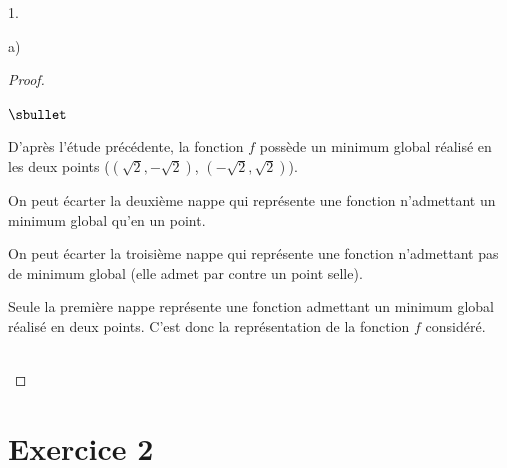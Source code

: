 \documentclass[11pt]{article}%
\begin{document}
\begin{noliste}{1.}
\begin{noliste}{a)}
    
    \begin{proof}~%
      \begin{noliste}{$\sbullet$}
      \item D'après l'étude précédente, la fonction $f$ possède un
        minimum global réalisé en les deux points ($(\sqrt{2},
        -\sqrt{2})$, $(-\sqrt{2}, \sqrt{2})$).
      \item On peut écarter la deuxième nappe qui représente une
        fonction n'admettant un minimum global qu'en un point.
      \item On peut écarter la troisième nappe qui représente une
        fonction n'admettant pas de minimum global (elle admet par
        contre un point selle).
      \item Seule la première nappe représente une fonction admettant
        un minimum global réalisé en deux points. C'est donc la
        représentation de la fonction $f$ considéré.          
      \end{noliste}
      ~\\[-1.4cm]
    \end{proof}
  \end{noliste}
\end{noliste}

\section*{Exercice 2}
\end{document}
